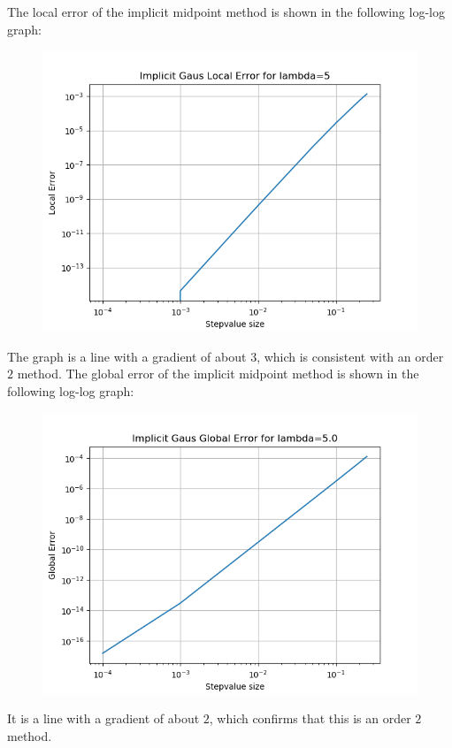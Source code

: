 \documentclass{article}
\theoremstyle{definition}
\begin{document}
\begin{itemize}
\begin{figure}[H]
		\end{figure}
		The local error of the implicit midpoint
		method is shown in the following log-log graph:
		\begin{figure}[H]
			\includegraphics[scale=0.6]{implicit_gauss_local_loglog}
		\end{figure}
		The graph is a line with a gradient of about $3$, which is
		consistent with an order $2$ method.
		The global error of the implicit midpoint
		method is shown in the following log-log graph:
		\begin{figure}[H]
			\includegraphics[scale=0.6]{implicit_gauss_global_loglog}
		\end{figure}
		It is a line with a gradient of about $2$, which confirms that
		this is an order $2$ method.


\end{itemize}
\end{document}
